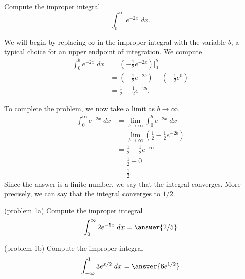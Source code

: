 \documentclass{ximera}
\begin{document}
\begin{example}[example 1]
Compute the improper integral
\[
\int_0^\infty e^{-2x} \; dx.
\]

We will begin by replacing $\infty$ in the improper integral with the variable $b$, a typical choice for an upper endpoint of integration.
We compute
\begin{align*}
\int_0^b e^{-2x} \; dx &= \left(-\frac12 e^{-2x} \right) \bigg|_0^b\\
                       &= \left(-\frac12 e^{-2b} \right) - \left(-\frac12 e^{0} \right)\\
                       &=\frac12 -\frac12 e^{-2b}.
\end{align*}
                       
To complete the problem, we now take a limit as $b \to \infty$.
\begin{align*}
\int_0^\infty e^{-2x} \; dx &= \lim_{b \to \infty}\int_0^b e^{-2x} \; dx\\
                       &=\lim_{b \to \infty} \left(\frac12 -\frac12 e^{-2b}\right)\\
                       &= \frac12 -\frac12 e^{-\infty}\\
                       &= \frac12 - 0 \\
                       &= \frac12.
\end{align*}
Since the answer is a finite number, we say that the integral converges.
More precisely, we can say that the integral converges to $1/2$.

\end{example}




\begin{problem}(problem 1a)
Compute the improper integral
\[
\int_0^\infty 2e^{-5x} \; dx = \answer{2/5}
\]
\begin{multipleChoice}
\end{multipleChoice}
\end{problem}


\begin{problem}(problem 1b)
Compute the improper integral
\[
\int_{-\infty}^1 3e^{x/2} \; dx = \answer{6e^{1/2}}
\]
\begin{multipleChoice}
\end{multipleChoice}
\end{problem}
\end{document}

